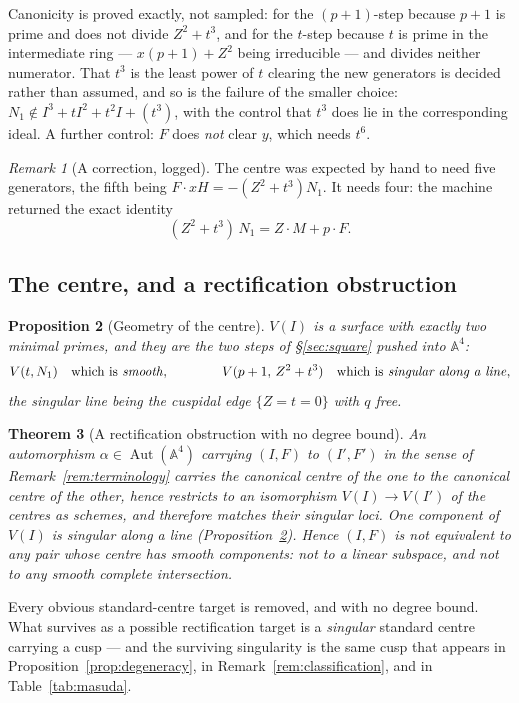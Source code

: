 \documentclass[11pt]{article}
\newtheorem{theorem}{Theorem}[section]
\newtheorem{proposition}[theorem]{Proposition}
\theoremstyle{definition}
\theoremstyle{remark}
\newtheorem{remark}[theorem]{Remark}
\newcommand{\Aff}[1]{\mathbb{A}^{#1}}
\newcommand{\Aut}{\operatorname{Aut}}
\begin{document}
Canonicity is proved exactly, not sampled: for the $(p+1)$-step because $p+1$
is prime and does not divide $Z^2+t^3$, and for the $t$-step because $t$ is
prime in the intermediate ring --- $x(p+1)+Z^2$ being irreducible --- and
divides neither numerator. That $t^3$ is the least power of $t$ clearing the
new generators is decided rather than assumed, and so is the failure of the
smaller choice: $N_1\notin I^3+tI^2+t^2I+(t^3)$, with the control that $t^3$
does lie in the corresponding ideal. A further control: $F$ does \emph{not}
clear $y$, which needs $t^6$.

\begin{remark}[A correction, logged]\label{rem:fourgen}
The centre was expected by hand to need five generators, the fifth being
$F\cdot xH=-(Z^2+t^3)N_1$. It needs four: the machine returned the exact
identity
\[
(Z^2+t^3)\,N_1 = Z\cdot M + p\cdot F .
\]
\end{remark}

\subsection{The centre, and a rectification obstruction}

\begin{proposition}[Geometry of the centre]\label{prop:centre}
$V(I)$ is a surface with exactly two minimal primes, and they are the two
steps of \S\ref{sec:square} pushed into $\Aff{4}$:
\[
V(t,N_1)\quad\text{which is \emph{smooth}},\qquad\qquad
V(p+1,\,Z^2+t^3)\quad\text{which is \emph{singular along a line}},
\]
the singular line being the cuspidal edge $\{Z=t=0\}$ with $q$ free.
\end{proposition}

\begin{theorem}[A rectification obstruction with no degree
bound]\label{thm:rectification}
An automorphism $\alpha\in\Aut(\Aff{4})$ carrying $(I,F)$ to $(I',F')$ in the
sense of Remark~\ref{rem:terminology} carries the canonical centre of the one
to the canonical centre of the other, hence restricts to an isomorphism
$V(I)\to V(I')$ of the centres as schemes, and therefore matches their
singular loci. One component of $V(I)$ is singular along a line
(Proposition~\ref{prop:centre}). Hence $(I,F)$ is \emph{not} equivalent to any
pair whose centre has smooth components: not to a linear subspace, and not to
any smooth complete intersection.
\end{theorem}

Every obvious standard-centre target is removed, and with no degree bound.
What survives as a possible rectification target is a \emph{singular} standard
centre carrying a cusp --- and the surviving singularity is the same cusp that
appears in Proposition~\ref{prop:degeneracy}, in
Remark~\ref{rem:classification}, and in Table~\ref{tab:masuda}.
\end{document}
